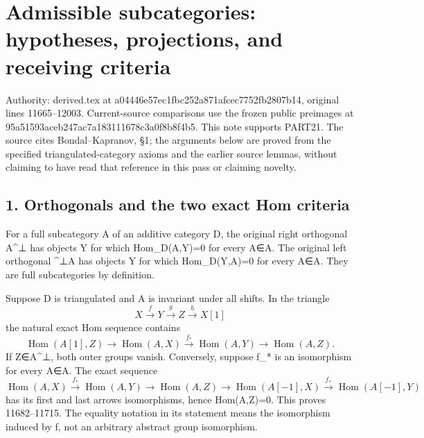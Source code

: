 \section{\texorpdfstring{Admissible subcategories:\allowbreak{} hypotheses,\allowbreak{} projections,\allowbreak{} and receiving criteria}{Admissible    and receiving criteria}}\label{proofs-11665-12003-admissible-subcategories-hypotheses-projections-and-receiving-criteria}

Authority:\allowbreak{} derived.tex at a04446e5\allowbreak{}7ec1fbc2\allowbreak{}52a871af\allowbreak{}cec7752f\allowbreak{}b2807b14, original lines 11665–\allowbreak{}12003. Current-source comparisons use the frozen public preimages at 95a51593\allowbreak{}aceb247a\allowbreak{}c7a18311\allowbreak{}1678c3a0\allowbreak{}f8b8f4b5. This note supports PART21. The source cites Bondal–\allowbreak{}Kapranov,\allowbreak{} §1; the arguments below are proved from the specified triangulated-category axioms and the earlier source lemmas,\allowbreak{} without claiming to have read that reference in this pass or claiming novelty.

\subsection{1. Orthogonals and the two exact Hom criteria}\label{proofs-11665-12003-orthogonals-and-the-two-exact-hom-criteria}

For a full subcategory A of an additive category D,\allowbreak{} the original right orthogonal A\^{}⊥ has objects Y for which Hom\_\allowbreak{}D(A,\allowbreak{}Y)\allowbreak{}\allowbreak{}=0 for every A\allowbreak{}∈A. The original left orthogonal \^{}⊥A has objects Y for which Hom\_\allowbreak{}D(Y,\allowbreak{}A)\allowbreak{}\allowbreak{}=0 for every A\allowbreak{}∈A. They are full subcategories by definition.

Suppose D is triangulated and A is invariant under all shifts. In the triangle \[
 X\xrightarrow fY\xrightarrow gZ\xrightarrow hX[1]
\] the natural exact Hom sequence contains \[
 \operatorname{Hom}(A[1],Z)\longrightarrow\operatorname{Hom}(A,X)
 \xrightarrow{f_*}\operatorname{Hom}(A,Y)
 \longrightarrow\operatorname{Hom}(A,Z).
\] If Z\allowbreak{}∈A\textasciicircum{}⊥,\allowbreak{} both outer groups vanish. Conversely,\allowbreak{} suppose f\_\allowbreak{}* is an isomorphism for every A\allowbreak{}∈A. The exact sequence \[
 \operatorname{Hom}(A,X)\xrightarrow{f_*}\operatorname{Hom}(A,Y)
 \longrightarrow\operatorname{Hom}(A,Z)
 \longrightarrow\operatorname{Hom}(A[-1],X)
 \xrightarrow{f_*}\operatorname{Hom}(A[-1],Y)
\] has its first and last arrows isomorphisms,\allowbreak{} hence Hom(A,\allowbreak{}Z)\allowbreak{}\allowbreak{}=0. This proves 11682–\allowbreak{}11715. The equality notation in its statement means the isomorphism induced by f,\allowbreak{} not an arbitrary abstract group isomorphism.

